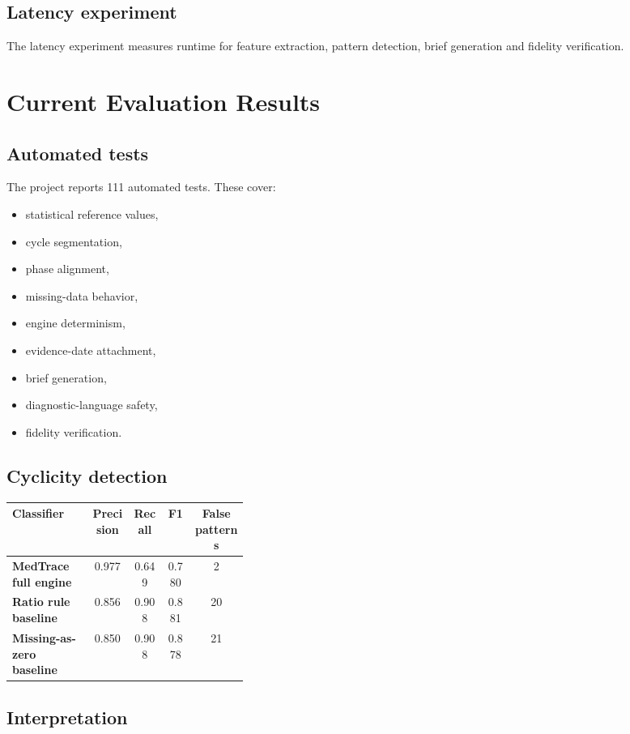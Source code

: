 \documentclass[11pt,a4paper]{article}
\begin{document}
\subsection{Latency experiment}

The latency experiment measures runtime for feature extraction, pattern detection, brief generation and fidelity verification.

\section{Current Evaluation Results}

\subsection{Automated tests}

The project reports 111 automated tests. These cover:

\begin{itemize}
  \item statistical reference values,
  \item cycle segmentation,
  \item phase alignment,
  \item missing-data behavior,
  \item engine determinism,
  \item evidence-date attachment,
  \item brief generation,
  \item diagnostic-language safety,
  \item fidelity verification.
\end{itemize}

\subsection{Cyclicity detection}

\begin{tabularx}{\linewidth}{>{\bfseries}p{0.34\linewidth}cccc}
\toprule
Classifier & Precision & Recall & F1 & False patterns \\
\midrule
MedTrace full engine & 0.977 & 0.649 & 0.780 & 2 \\
Ratio rule baseline & 0.856 & 0.908 & 0.881 & 20 \\
Missing-as-zero baseline & 0.850 & 0.908 & 0.878 & 21 \\
\bottomrule
\end{tabularx}

\subsection{Interpretation}
\end{document}
